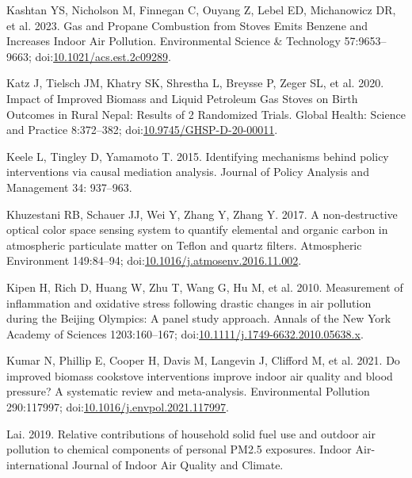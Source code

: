 \documentclass[
  letterpaper,
  DIV=11,
  numbers=noendperiod]{scrartcl}
\newlength{\cslhangindent}
\newenvironment{CSLReferences}[2] %
 {\begin{list}{}{%
  \setlength{\itemindent}{0pt}
  \setlength{\leftmargin}{0pt}
  \setlength{\parsep}{0pt}
  \ifodd #1
   \setlength{\leftmargin}{\cslhangindent}
   \setlength{\itemindent}{-1\cslhangindent}
  \fi
  \setlength{\itemsep}{#2\baselineskip}}}
 {\end{list}}
\begin{document}
\begin{CSLReferences}{1}{1}
Kashtan YS, Nicholson M, Finnegan C, Ouyang Z, Lebel ED, Michanowicz DR,
et al. 2023. Gas and {Propane Combustion} from {Stoves Emits Benzene}
and {Increases Indoor Air Pollution}. Environmental Science \&
Technology 57:9653--9663;
doi:\href{https://doi.org/10.1021/acs.est.2c09289}{10.1021/acs.est.2c09289}.

Katz J, Tielsch JM, Khatry SK, Shrestha L, Breysse P, Zeger SL, et al.
2020. Impact of {Improved Biomass} and {Liquid Petroleum Gas Stoves} on
{Birth Outcomes} in {Rural Nepal}: {Results} of 2 {Randomized Trials}.
Global Health: Science and Practice 8:372--382;
doi:\href{https://doi.org/10.9745/GHSP-D-20-00011}{10.9745/GHSP-D-20-00011}.

Keele L, Tingley D, Yamamoto T. 2015. Identifying mechanisms behind
policy interventions via causal mediation analysis. Journal of Policy
Analysis and Management 34: 937--963.

Khuzestani RB, Schauer JJ, Wei Y, Zhang Y, Zhang Y. 2017. A
non-destructive optical color space sensing system to quantify elemental
and organic carbon in atmospheric particulate matter on {Teflon} and
quartz filters. Atmospheric Environment 149:84--94;
doi:\href{https://doi.org/10.1016/j.atmosenv.2016.11.002}{10.1016/j.atmosenv.2016.11.002}.

Kipen H, Rich D, Huang W, Zhu T, Wang G, Hu M, et al. 2010. Measurement
of inflammation and oxidative stress following drastic changes in air
pollution during the {Beijing Olympics}: A panel study approach. Annals
of the New York Academy of Sciences 1203:160--167;
doi:\href{https://doi.org/10.1111/j.1749-6632.2010.05638.x}{10.1111/j.1749-6632.2010.05638.x}.

Kumar N, Phillip E, Cooper H, Davis M, Langevin J, Clifford M, et al.
2021. Do improved biomass cookstove interventions improve indoor air
quality and blood pressure? {A} systematic review and meta-analysis.
Environmental Pollution 290:117997;
doi:\href{https://doi.org/10.1016/j.envpol.2021.117997}{10.1016/j.envpol.2021.117997}.

Lai. 2019. Relative contributions of household solid fuel use and
outdoor air pollution to chemical components of personal {PM2}.5
exposures. Indoor Air-international Journal of Indoor Air Quality and
Climate.


\end{CSLReferences}
\end{document}
